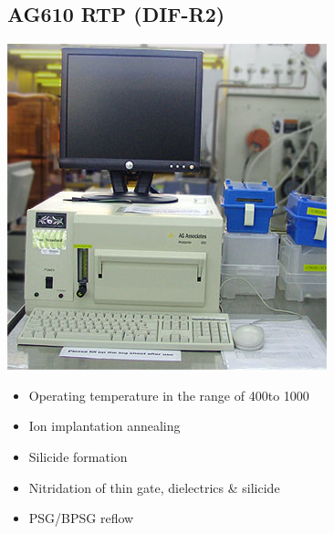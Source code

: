 \subsection{AG610 RTP (DIF-R2)}\label{thermal_RTAAG610_machine}

\begin{minipage}[H]{\MachinePictureMiniPageWidth}
	\includegraphics[width=\MachinePictureWidth]{pictures_machines/thermal_RTAAG610.png}
\end{minipage}\begin{minipage}[H]{\MachineTextMiniPageWidth}
	\begin{itemize}
		\item Operating temperature in the range of 400\degreesC to 1000\degreesC
		\item Ion implantation annealing
		\item Silicide formation
		\item Nitridation of thin gate, dielectrics \& silicide
		\item PSG/BPSG reflow
	\end{itemize}

\end{minipage}